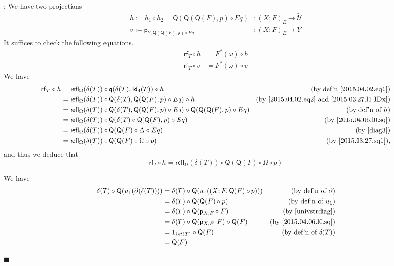 \documentclass[12pt]{article}
\numberwithin{equation}{section}
\newenvironment{eq}{\begin{equation}}{\end{equation}}
\newenvironment{myproof}{{\bf Proof}:}{$\blacksquare$ \vskip 5mm }
\newcommand{\by}[1]{\text{(by #1)}}
\newcommand{\sr}{\rightarrow}
\newcommand{\wt}{\widetilde}
\newcommand{\id}{1}            %
\newcommand{\p}{\mathsf{p}}
\newcommand{\q}{\mathsf{q}}
\newcommand{\Idx}{\mathsf{Id_3}} %
\newcommand{\refl}{\mathsf{refl}}
\newcommand{\U}{\mathcal{U}}
\newcommand{\rf}{\mathsf{rf}}
\newcommand{\Q}{\mathsf{Q}}
\begin{document}
\begin{myproof}
We have two projections
%
\begin{align*}
  h := h_1\circ h_2=\Q(\Q(\Q(F),p)\circ Eq)&:(X;F)_{E}\sr \wt{\U} \\
  v := \p_{Y,\Q(\Q(F),p)\circ Eq}&:(X;F)_{E} \sr Y
\end{align*}
%
It suffices to check the following equations.
%
\begin{align*}
  \rf_T\circ h &=F^*(\omega)\circ h \\
  \rf_T\circ v &=F^*(\omega)\circ v
\end{align*}
%
We have
%
\begin{align*}
  \rf_T \circ h
  & = \refl_\Omega(\delta(T))\circ \q(\delta(T),\Idx(T))         \circ h & \by{def'n \ref{2015.04.02.eq1}} \\
  & = \refl_\Omega(\delta(T))\circ \Q(\delta(T),\Q(\Q(F),p)      \circ Eq) \circ h & \by{\ref{2015.04.02.eq2} and \ref{2015.03.27.l1-IDx}} \\
  & = \refl_\Omega(\delta(T))\circ \Q(\delta(T),\Q(\Q(F),p)      \circ Eq) \circ \Q(\Q(\Q(F),p)\circ Eq) & \by{def'n of $h$} \\
  & = \refl_\Omega(\delta(T))\circ \Q(\delta(T)\circ \Q(\Q(F),p) \circ Eq) & \by{\ref{2015.04.06.l0.sq}}\\
  & = \refl_\Omega(\delta(T))\circ \Q(\Q(F)\circ \Delta          \circ Eq) & \by{\ref{diag3}}\\
  & = \refl_\Omega(\delta(T))\circ \Q(\Q(F)\circ \Omega          \circ p) & \by{\ref{2015.03.27.sq1}},
\end{align*}
and thus we deduce that
\begin{eq}
  \label{eqnrfth}
  \rf_T \circ h = \refl_\Omega(\delta(T))\circ \Q(\Q(F)\circ \Omega \circ p)
\end{eq}

%

We have
%
\begin{align*}
        \delta(T) \circ \Q(u_1(\partial(\delta(T)))) 
    & = \delta(T) \circ \Q(u_1((X;F,\Q(F) \circ p))) & \by{def'n of $\partial$} \\
    & = \delta(T) \circ \Q(\Q(F) \circ p)            & \by{def'n of $u_1$} \\
    & = \delta(T) \circ \Q(\p_{X,F} \circ F)         & \by{\ref{univstrdiag}} \\
    & = \delta(T) \circ \Q(\p_{X,F},F) \circ \Q(F)   & \by{\ref{2015.04.06.l0.sq}} \\
    & = \id_{int(T)} \circ \Q(F)                     & \by{def'n of $\delta(T)$} \\
    & = \Q(F)                                        &
\end{align*}
%


\end{myproof}
\end{document}
